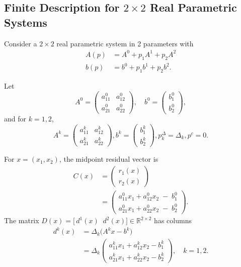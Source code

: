 \documentclass{article}
\theoremstyle{definition}
\theoremstyle{remark}
\begin{document}
\subsection{Finite Description for $2 \times 2$ Real Parametric Systems} 
\label{app:finite-description-example}
Consider a $2 \times 2$ real parametric system in 2 parameters with 
%
\begin{align*} 
A(p) &= A^0 + p_1A^1 + p_2A^2
\\ b(p) &= b^0 + p_1b^1 + p_2b^2 . 
\end{align*} 

Let
\[
A^0 = \begin{pmatrix}
a^0_{11} & a^0_{12} \\[4pt]
a^0_{21} & a^0_{22}
\end{pmatrix}, \quad
b^0 = \begin{pmatrix}
b^0_1 \\[3pt]
b^0_2
\end{pmatrix},
\]
and for \(k=1,2\),
\[
A^k = \begin{pmatrix}
a^k_{11} & a^k_{12} \\[4pt]
a^k_{21} & a^k_{22}
\end{pmatrix},
b^k = \begin{pmatrix}
b^k_1 \\[3pt]
b^k_2
\end{pmatrix},
p_k^\Delta = \Delta_k, p^c = 0. 
\]

For \(x=(x_1,x_2)\), 
the midpoint residual vector is 
\begin{align*}
    C(x) &=  
    \begin{pmatrix}
    r_1(x) \\[4pt]
    r_2(x)
    \end{pmatrix} \\
    &= 
    \begin{pmatrix}
    a^0_{11}x_1 + a^0_{12}x_2 \;-\; b^0_1 \\[6pt]
    a^0_{21}x_1 + a^0_{22}x_2 \;-\; b^0_2
    \end{pmatrix} 
    .
\end{align*} 
%
The matrix $D(x) = \bigl[\,d^1(x)\;\;d^2(x)\bigr] \in\mathbb{R}^{2\times2}$ has columns  
\begin{align*}
    d^k(x)
    &=\Delta_k\bigl(A^k x - b^k\bigr) \\
    &=\Delta_k
    \begin{pmatrix}
    a^k_{11}x_1 + a^k_{12}x_2 - b^k_1 \\[4pt]
    a^k_{21}x_1 + a^k_{22}x_2 - b^k_2
    \end{pmatrix}, \quad k=1,2. 
\end{align*}
\end{document}
